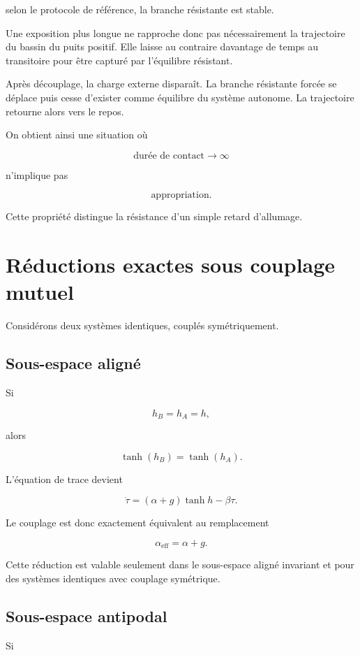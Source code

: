 selon le protocole de référence, la branche résistante est stable.

Une exposition plus longue ne rapproche donc pas nécessairement la
trajectoire du bassin du puits positif. Elle laisse au contraire davantage de
temps au transitoire pour être capturé par l'équilibre résistant.

Après découplage, la charge externe disparaît. La branche résistante
forcée se déplace puis cesse d'exister comme équilibre du système
autonome. La trajectoire retourne alors vers le repos.

On obtient ainsi une situation où

\[
\text{durée de contact}\to\infty
\]

n'implique pas

\[
\text{appropriation}.
\]

Cette propriété distingue la résistance d'un simple retard
d'allumage.

\section{Réductions exactes sous couplage mutuel}
\label{annexe-resistance-couplage-mutuel}

Considérons deux systèmes identiques, couplés symétriquement.

\subsection{Sous-espace aligné}

Si

\[
h_B=h_A=h,
\]

alors

\[
\tanh(h_B)=\tanh(h_A).
\]

L'équation de trace devient

\[
\dot\tau
=
(\alpha+g)\tanh h
-
\beta\tau.
\]

Le couplage est donc exactement équivalent au remplacement

\[
\boxed{
\alpha_{\mathrm{eff}}
=
\alpha+g.
}
\]

Cette réduction est valable seulement dans le sous-espace aligné
invariant et pour des systèmes identiques avec couplage symétrique.

\subsection{Sous-espace antipodal}

Si

